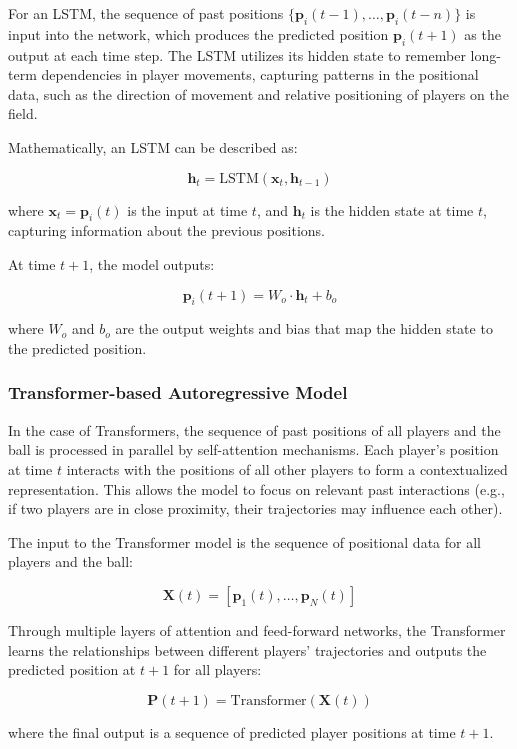 \documentclass[sigconf]{acmart}
\begin{document}
For an LSTM, the sequence of past positions $\{ \mathbf{p}_i(t-1), \dots, \mathbf{p}_i(t-n) \}$ is input into the network, which produces the predicted position $\mathbf{p}_i(t+1)$ as the output at each time step. The LSTM utilizes its hidden state to remember long-term dependencies in player movements, capturing patterns in the positional data, such as the direction of movement and relative positioning of players on the field.

Mathematically, an LSTM can be described as:

\[
\mathbf{h}_t = \text{LSTM}(\mathbf{x}_t, \mathbf{h}_{t-1})
\]

where $\mathbf{x}_t = \mathbf{p}_i(t)$ is the input at time $t$, and $\mathbf{h}_t$ is the hidden state at time $t$, capturing information about the previous positions.

At time $t+1$, the model outputs:

\[
\mathbf{p}_i(t+1) = W_o \cdot \mathbf{h}_t + b_o
\]

where $W_o$ and $b_o$ are the output weights and bias that map the hidden state to the predicted position.

\subsubsection{Transformer-based Autoregressive Model}

In the case of Transformers, the sequence of past positions of all players and the ball is processed in parallel by self-attention mechanisms. Each player’s position at time $t$ interacts with the positions of all other players to form a contextualized representation. This allows the model to focus on relevant past interactions (e.g., if two players are in close proximity, their trajectories may influence each other).

The input to the Transformer model is the sequence of positional data for all players and the ball:

\[
\mathbf{X}(t) = \left[ \mathbf{p}_1(t), \dots, \mathbf{p}_N(t) \right]
\]

Through multiple layers of attention and feed-forward networks, the Transformer learns the relationships between different players' trajectories and outputs the predicted position at $t+1$ for all players:

\[
\mathbf{P}(t+1) = \text{Transformer}(\mathbf{X}(t))
\]

where the final output is a sequence of predicted player positions at time $t+1$.
\end{document}
